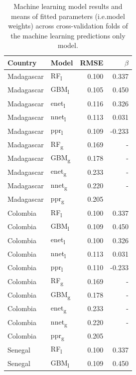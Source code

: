 \documentclass[11pt]{article}
\begin{document}
\begin{table}
\caption{Machine learning model results and means of fitted parameters (i.e.\thinspace model weights) across cross-validation folds of the machine learning predictions only model. }
\centering
\small
\begin{tabular}{ll|rr}
     Country          & Model &      RMSE & $\beta$ \\ \hline
Madagascar & RF\textsubscript{l} & 0.100 & 0.337 \\
Madagascar & GBM\textsubscript{l} & 0.105 & 0.450 \\
Madagascar & enet\textsubscript{l} & 0.116 & 0.326 \\
Madagascar & nnet\textsubscript{l} & 0.113 & 0.031 \\
Madagascar & ppr\textsubscript{l} & 0.109 & -0.233\vspace{0.3cm}\\ 
Madagascar & RF\textsubscript{g} &  0.169 & - \\
Madagascar & GBM\textsubscript{g} &  0.178& - \\
Madagascar & enet\textsubscript{g} & 0.233 & - \\
Madagascar & nnet\textsubscript{g} &  0.220 & - \\
Madagascar & ppr\textsubscript{g} & 0.205 &   \vspace{0.3cm}\\
Colombia & RF\textsubscript{l} & 0.100 & 0.337 \\
Colombia & GBM\textsubscript{l} & 0.109 & 0.450  \\
Colombia & enet\textsubscript{l} & 0.100 & 0.326 \\
Colombia & nnet\textsubscript{l} & 0.113 & 0.031 \\
Colombia & ppr\textsubscript{l} & 0.110 & -0.233\vspace{0.3cm}\\
Colombia & RF\textsubscript{g} & 0.169 & -\\
Colombia & GBM\textsubscript{g} & 0.178 & - \\
Colombia & enet\textsubscript{g} & 0.233 & - \\
Colombia & nnet\textsubscript{g} & 0.220 & - \\
Colombia & ppr\textsubscript{g} & 0.205 & \vspace{0.3cm}\\ 
Senegal & RF\textsubscript{l} & 0.100 & 0.337 \\
Senegal & GBM\textsubscript{l} & 0.109 & 0.450 \\

\end{tabular}
\end{table}
\end{document}
